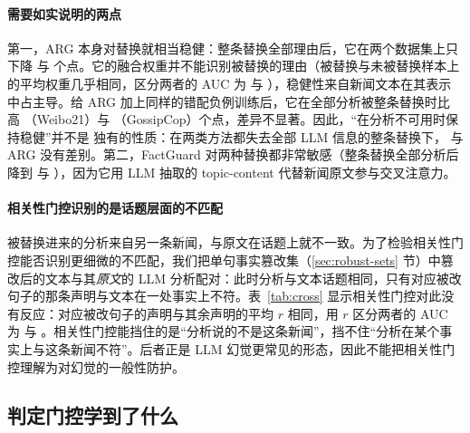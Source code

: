 \paragraph{需要如实说明的两点}
第一，ARG 本身对替换就相当稳健：整条替换全部理由后，它在两个数据集上只下降  与  个点。它的融合权重并不能识别被替换的理由（被替换与未被替换样本上的平均权重几乎相同，区分两者的 AUC 为  与 ），稳健性来自新闻文本在其表示中占主导。给 ARG 加上同样的错配负例训练后，它在全部分析被整条替换时比 \method{} 高 （Weibo21）与 （GossipCop）个点，差异不显著。因此，“在分析不可用时保持稳健”并不是 \method{} 独有的性质：在两类方法都失去全部 LLM 信息的整条替换下，\method{} 与 ARG 没有差别。第二，FactGuard 对两种替换都非常敏感（整条替换全部分析后降到  与 ），因为它用 LLM 抽取的 topic-content 代替新闻原文参与交叉注意力。

\paragraph{相关性门控识别的是话题层面的不匹配}
被替换进来的分析来自另一条新闻，与原文在话题上就不一致。为了检验相关性门控能否识别更细微的不匹配，我们把单句事实篡改集（\ref{sec:robust-sets} 节）中篡改后的文本与其\emph{原文}的 LLM 分析配对：此时分析与文本话题相同，只有对应被改句子的那条声明与文本在一处事实上不符。表~\ref{tab:cross} 显示相关性门控对此没有反应：对应被改句子的声明与其余声明的平均 $r$ 相同，用 $r$ 区分两者的 AUC 为  与 。相关性门控能挡住的是“分析说的不是这条新闻”，挡不住“分析在某个事实上与这条新闻不符”。后者正是 LLM 幻觉更常见的形态，因此不能把相关性门控理解为对幻觉的一般性防护。

\begin{table}[!htbp]
\centering\small
\caption{篡改后的文本分别搭配它自己的分析与原文的分析时，各类实例上的平均相关性门控 $r$（3 个种子）。}\label{tab:cross}
\end{table}

\subsection{判定门控学到了什么}\label{sec:exp-gate}

